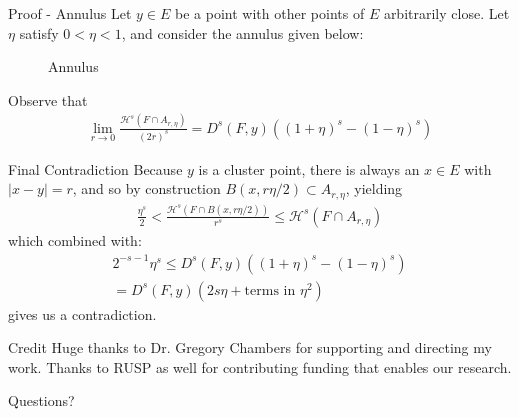 \documentclass[10pt]{beamer}
\begin{document}
\begin{frame}{Proof - Annulus}
	Let \(y \in E\) be a point with other points of \(E\) arbitrarily close. Let \(\eta \) satisfy \(0<\eta <1\), and consider the annulus given below:

\begin{figure}[ht]
    \caption{Annulus}
    \label{fig:annulus}
\end{figure}
Observe that
\begin{align*}
	\lim_{r \to 0} \frac{\mathcal{H}^{s}(F\cap A_{r,\eta })}{(2r)^{s}} = D^{s}(F,y)((1+\eta )^{s}-(1-\eta )^{s})
\end{align*}

\end{frame}

\begin{frame}{Final Contradiction}
	Because \(y\) is a cluster point, there is always an \(x \in E\) with \(\left| x-y \right| =r\), and so by construction \(B(x,r \eta  / 2) \subset A_{r,\eta }\), yielding
	\begin{align*}
		\frac{\eta^{s}}{2} < \frac{\mathcal{H}^{s}(F\cap B(x,r \eta  / 2))}{r^{s}}\leq \mathcal{H}^{s}(F\cap A_{r,\eta })
	\end{align*}
	which combined with:
	\begin{align*}
		2^{-s-1}\eta^{s} \leq D^{s}(F,y)((1+\eta )^{s}-(1-\eta )^{s})\\
		= D^{s}(F,y)(2s \eta + \text{terms in }\eta^2)
	\end{align*}
	gives us a contradiction.
\end{frame}

\begin{frame}{Credit}
	Huge thanks to Dr. Gregory Chambers for supporting and directing my work. Thanks to RUSP as well for contributing funding that enables our research.
\end{frame}

\begin{frame}{Questions?}
	
\end{frame}
\end{document}
